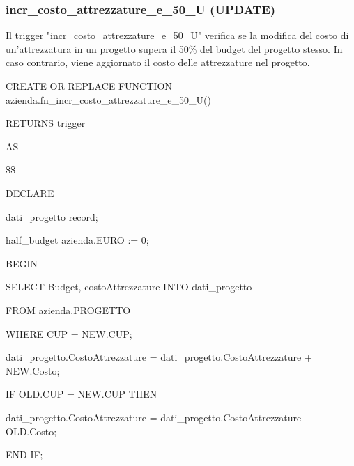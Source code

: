     
    \subsubsection{incr\_costo\_attrezzature\_e\_50\_U (UPDATE)}
    Il trigger "incr\_costo\_attrezzature\_e\_50\_U" verifica se la modifica del costo di un'attrezzatura in un progetto supera il 50\% del budget del progetto stesso. In caso contrario, viene aggiornato il costo delle attrezzature nel progetto.
    \ttfamily
        \begin{flushleft}
            \begin{description}
                \item CREATE OR REPLACE FUNCTION azienda.fn\_incr\_costo\_attrezzature\_e\_50\_U()  
                \item RETURNS trigger
                \item AS
                \item \$\$
                \item DECLARE
                \begin{description}
                    \item dati\_progetto record;
                    \item half\_budget azienda.EURO := 0;
                \end{description}
                \item BEGIN 
                \begin{description}
                    \item SELECT Budget, costoAttrezzature INTO dati\_progetto
                    \item FROM azienda.PROGETTO
                    \item WHERE CUP = NEW.CUP;
                    
                    \vspace{0.5cm}

                    \item dati\_progetto.CostoAttrezzature = dati\_progetto.CostoAttrezzature + NEW.Costo;
                    \item IF OLD.CUP = NEW.CUP THEN
                    \begin{description}
                        \item dati\_progetto.CostoAttrezzature = dati\_progetto.CostoAttrezzature - OLD.Costo;
                    \end{description}
                    \item END IF;
                

\end{description}
\end{description}
\end{flushleft}
